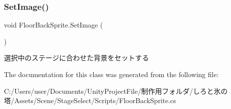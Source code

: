 \subsubsection{\texorpdfstring{Set\+Image()}{SetImage()}}
{\footnotesize\ttfamily void Floor\+Back\+Sprite.\+Set\+Image (\begin{DoxyParamCaption}{ }\end{DoxyParamCaption})\hspace{0.3cm}{\ttfamily [inline]}}



選択中のステージに合わせた背景をセットする 



The documentation for this class was generated from the following file\+:\begin{DoxyCompactItemize}
\item 
C\+:/\+Users/user/\+Documents/\+Unity\+Project\+File/制作用フォルダ/しろと氷の塔/\+Assets/\+Scene/\+Stage\+Select/\+Scripts/Floor\+Back\+Sprite.\+cs\end{DoxyCompactItemize}
